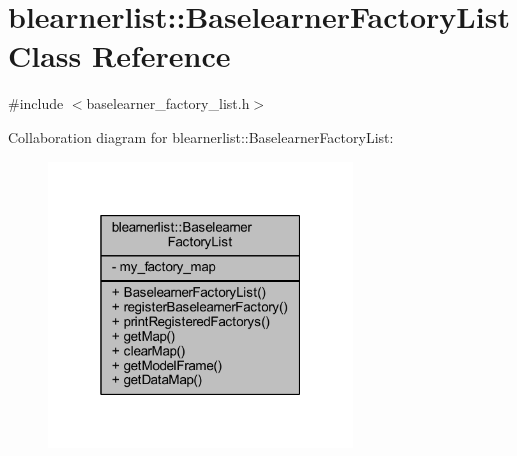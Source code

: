 \hypertarget{classblearnerlist_1_1_baselearner_factory_list}{}\section{blearnerlist\+:\+:Baselearner\+Factory\+List Class Reference}
\label{classblearnerlist_1_1_baselearner_factory_list}


{\ttfamily \#include $<$baselearner\+\_\+factory\+\_\+list.\+h$>$}



Collaboration diagram for blearnerlist\+:\+:Baselearner\+Factory\+List\+:\nopagebreak
\begin{figure}[H]
\begin{center}
\leavevmode
\includegraphics[width=229pt]{classblearnerlist_1_1_baselearner_factory_list__coll__graph}
\end{center}
\end{figure}
